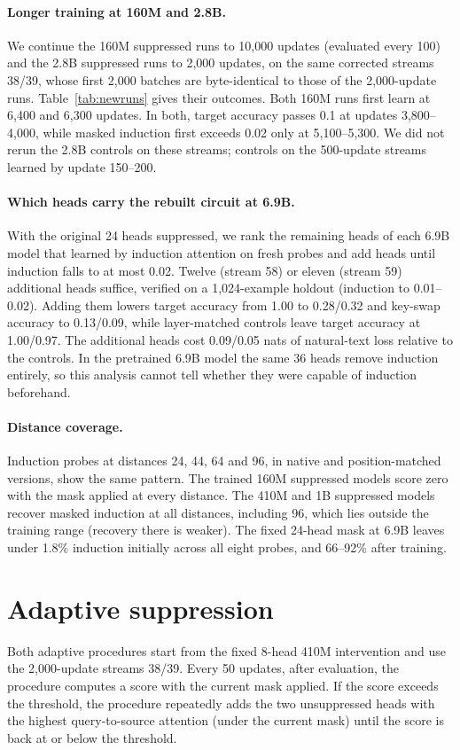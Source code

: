 \paragraph{Longer training at 160M and 2.8B.}
We continue the 160M suppressed runs to 10,000 updates (evaluated every 100) and
the 2.8B suppressed runs to 2,000 updates, on the same corrected streams 38/39,
whose first 2,000 batches are byte-identical to those of the 2,000-update runs.
Table~\ref{tab:newruns} gives their outcomes. Both 160M runs first learn at 6,400
and 6,300 updates. In both, target accuracy passes 0.1 at updates 3,800--4,000,
while masked induction first exceeds 0.02 only at 5,100--5,300. We did not rerun
the 2.8B controls on these streams; controls on the 500-update streams learned by
update 150--200.

\paragraph{Which heads carry the rebuilt circuit at 6.9B.}
With the original 24 heads suppressed, we rank the remaining heads of each 6.9B
model that learned by induction attention on fresh probes and add heads until
induction falls to at most 0.02. Twelve (stream 58) or eleven (stream 59) additional
heads suffice, verified on a 1,024-example holdout (induction to 0.01--0.02).
Adding them lowers target accuracy from 1.00 to 0.28/0.32 and key-swap accuracy to
0.13/0.09, while layer-matched controls leave target accuracy at 1.00/0.97. The
additional heads cost 0.09/0.05 nats of natural-text loss relative to the controls.
In the pretrained 6.9B model the same 36 heads remove induction entirely, so this
analysis cannot tell whether they were capable of induction beforehand.

\paragraph{Distance coverage.}
Induction probes at distances 24, 44, 64 and 96, in native and position-matched
versions, show the same pattern. The trained 160M suppressed models score zero with
the mask applied at every distance. The 410M and 1B suppressed models recover masked
induction at all distances, including 96, which lies outside the training range
(recovery there is weaker). The fixed 24-head mask at 6.9B leaves under 1.8\%
induction initially across all eight probes, and 66--92\% after training.

\section{Adaptive suppression}
\label{app:adaptive}
Both adaptive procedures start from the fixed 8-head 410M intervention and use the
2,000-update streams 38/39. Every 50 updates, after evaluation, the procedure
computes a score with the current mask applied. If the score exceeds the
threshold, the procedure repeatedly adds the two unsuppressed heads with the highest
query-to-source attention (under the current mask) until the score is back at or
below the threshold.

